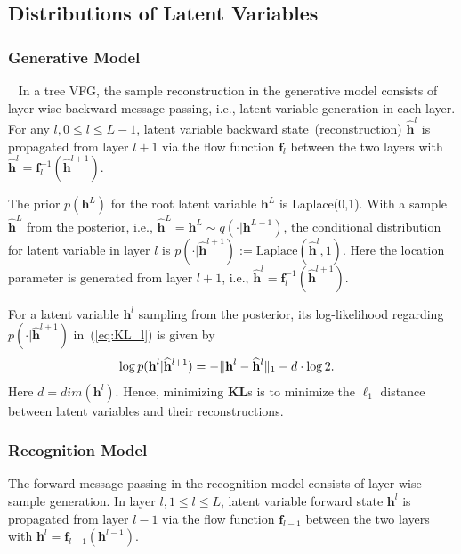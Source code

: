 \documentclass[twoside]{article}
\begin{document}


\subsection{Distributions of Latent Variables}


\subsubsection{Generative Model}~\label{sec:generative}
In a tree VFG, the sample reconstruction in the generative model consists of layer-wise backward message passing, i.e., latent variable generation in each layer.  For any $l, 0 \leq l \leq L-1$, latent variable backward state~(reconstruction) $\widehat{\mathbf{h}}^{l}$ is propagated   from layer $l+1$ via the flow function $\mathbf{f}_l$ between the two layers with $\widehat{\mathbf{h}}^{l}= \mathbf{f}_l^{-1}(\widehat{\mathbf{h}}^{l+1})$. 


The prior $p(\mathbf{h}^L)$ for the root latent variable $\mathbf{h}^L$ is  Laplace(0,1). With a sample $\widehat{\mathbf{h}}^L$ from the posterior, i.e., $\widehat{\mathbf{h}}^L=\mathbf{h}^L \sim q(\cdot | \mathbf{h}^{L-1}) $,  the conditional distribution for latent variable in layer $l$ is   $p(\cdot | \widehat{\mathbf{h}}^{l+1}):=\text{Laplace}(\widehat{\mathbf{h}}^l, 1)$. Here the location parameter is generated from layer $l+1$, i.e., $\widehat{\mathbf{h}}^{l}= \mathbf{f}_l^{-1}(\widehat{\mathbf{h}}^{l+1})$. 

For a latent variable  $\mathbf{h}^l$ sampling from the posterior, its log-likelihood regarding $p(\cdot | \widehat{\mathbf{h}}^{l+1})$ in~(\ref{eq:KL_l}) is given by 
\begin{align} \notag
& \log p(\mathbf{h}^l | \widehat{\mathbf{h}}^{l+1}) = -\|\mathbf{h}^l- \widehat{\mathbf{h}}^l\|_1 -d\cdot\log2  .
\end{align}
Here $d = dim(\mathbf{h}^l)$. Hence, minimizing  $\mathbf{KL}$s is to minimize the $\ell_1$ distance between latent variables and their reconstructions. 


\subsubsection{Recognition Model}
The forward message passing in the recognition model consists of  layer-wise sample generation. In layer $l, 1 \leq l \leq L$, latent variable forward state $\mathbf{h}^{l}$ is propagated   from layer $l-1$ via the flow function $\mathbf{f}_{l-1}$ between the two layers with $\mathbf{h}^{l}= \mathbf{f}_{l-1}(\mathbf{h}^{l-1})$. 
\end{document}
